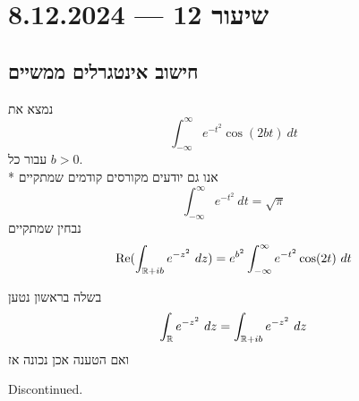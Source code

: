 \section{שיעור 12 --- 8.12.2024}
\subsection{חישוב אינטגרלים ממשיים}
\begin{example}
	נמצא את
	\[
		\int_{-\infty}^{\infty} e^{-t^2} \cos(2b t)\ dt
	\]
	עבור כל $b > 0$. \\*
	אנו גם יודעים מקורסים קודמים שמתקיים
	\[
		\int_{-\infty}^{\infty} e^{-t^2}\ dt = \sqrt{\pi}
	\]
	נבחין שמתקיים
	\[
		\re(\int_{\RR + ib} e^{-z^2}\ dz) = e^{b^2} \int_{-\infty}^{\infty}  e^{-t^2} \cos(2t)\ dt
	\]

	בשלה בראשון נטען
	\[
		\int_{\mathbb{R}} e^{-z^2}\ dz = \int_{\mathbb{R} + ib} e^{-z^2}\ dz
	\]
	ואם הטענה אכן נכונה אז
\end{example}

Discontinued.

